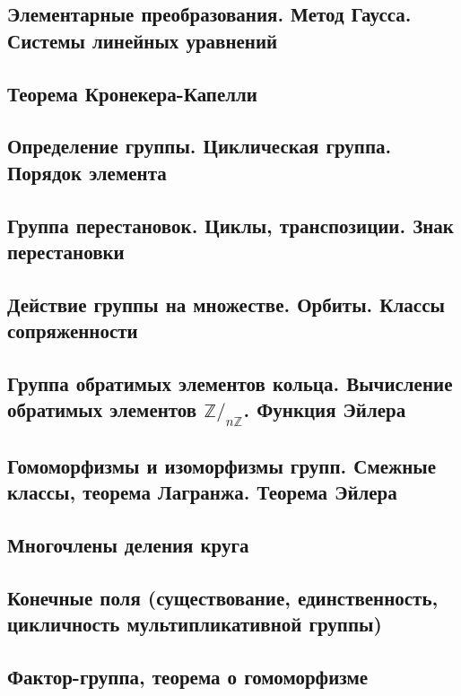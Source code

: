 \documentclass[a4paper,100pt]{article}
\theoremstyle{indented}
\theoremstyle{definition}
\theoremstyle{remark}
\begin{document}
\subsection{Элементарные преобразования. Метод Гаусса. Системы линейных уравнений}

\subsection{Теорема Кронекера-Капелли}

\subsection{Определение группы. Циклическая группа. Порядок элемента}

\subsection{Группа перестановок. Циклы, транспозиции. Знак перестановки}

\subsection{Действие группы на множестве. Орбиты. Классы сопряженности}

\subsection{Группа обратимых элементов кольца. Вычисление обратимых элементов $\mathbb{Z}/_{n\mathbb{Z}}$. Функция Эйлера}

\subsection{Гомоморфизмы и изоморфизмы групп. Смежные классы, теорема Лагранжа. Теорема Эйлера}

\subsection{Многочлены деления круга}

\subsection{Конечные поля (существование, единственность, цикличность мультипликативной группы)}

\subsection{Фактор-группа, теорема о гомоморфизме}
\end{document}
